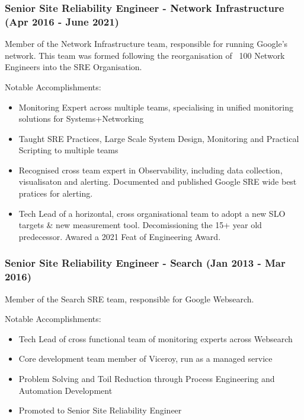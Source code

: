 \documentclass[a4paper, 10pt] {article}
\begin{document}
\subsubsection*{Senior Site Reliability Engineer - Network Infrastructure (Apr 2016 - June 2021)}

Member of the Network Infrastructure team, responsible for running Google's network. This team was formed
following the reorganisation of ~100 Network Engineers into the SRE Organisation.

\vspace{4mm}  %

Notable Accomplishments:

\begin{itemize}[itemsep=2pt,parsep=2pt]
  \item Monitoring Expert across multiple teams, specialising in unified monitoring solutions for Systems+Networking
  \item Taught SRE Practices, Large Scale System Design, Monitoring and Practical Scripting to multiple teams
  \item Recognised cross team expert in Observability, including data collection, visualisaton and alerting. Documented and published Google SRE wide best pratices for alerting.
  \item Tech Lead of a horizontal, cross organisational team to adopt a new SLO targets \& new measurement tool. Decomissioning the 15+ year old predecessor. Awared a 2021 Feat of   Engineering Award.
\end{itemize}

\subsubsection*{Senior Site Reliability Engineer - Search (Jan 2013 - Mar 2016)}

Member of the Search SRE team, responsible for Google Websearch.

\vspace{4mm}  %

Notable Accomplishments:

\begin{itemize}[itemsep=2pt,parsep=2pt]
  \item Tech Lead of cross functional team of monitoring experts across Websearch
  \item Core development team member of Viceroy, run as a managed service
  \item Problem Solving and Toil Reduction through Process Engineering and Automation Development
  \item Promoted to Senior Site Reliability Engineer
\end{itemize}
\end{document}
